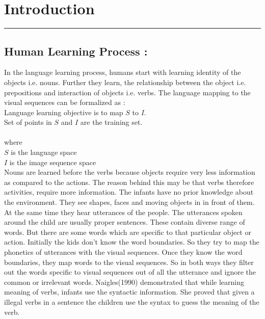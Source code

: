 \def\DevnagVersion{2.15}\documentclass[a4paper, 11pt, notitlepage]{report}
\begin{document}

\chapter{Introduction}
\hrule height 2pt
\vspace*{10pt} 

\hspace*{10pt} \section{Human Learning Process :}
In the language learning process, humans start with learning identity of the objects i.e. nouns. Further they learn, the relationship between the object i.e. prepositions and interaction of objects i.e. verbs. The language mapping to the visual sequences can be formalized\cite{ICDICD544} as : \\
\hspace*{50pt}{\bf 1 - } Language learning objective is to map $S$ to $I$.\\ 
\hspace*{50pt}{\bf 2 - } Set of points in $S$ and $I$ are the training set.\\\\
where\\
\hspace*{40pt}$S$ is the language space\\
\hspace*{40pt}$I$ is the image sequence space\\

Nouns are learned before the verbs because objects require very less information as compared to the actions. The reason behind this may be that verbs therefore activities, require more information. 
The infants have no prior knowledge about the environment. They see shapes, faces and moving objects in in front of them. At the same time they hear utterances of the people. The utterances spoken around the child are usually proper sentences. These contain diverse range of words. But there are some words which are specific to that particular object or action. Initially the kids don't know the word boundaries. So they try to map the phonetics of utterances with the visual sequences. Once they know the word boundaries, they map words to the visual sequences. So in both ways they filter out the words specific to visual sequences out of all the utterance and ignore the common or irrelevant words. Naigles(1990)\cite{naigles} demonstrated that while learning meaning of verbs, infants use the syntactic information. She proved that given a illegal verbs in a sentence the children use the syntax to guess the meaning of the verb. \\
\end{document}
